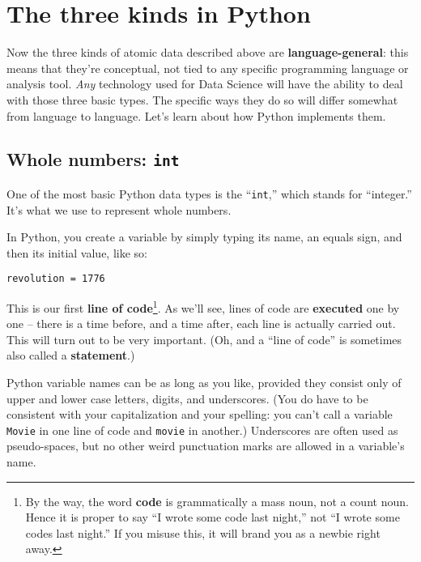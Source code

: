 \section{The three kinds in Python}

Now the three kinds of atomic data described above are
\textbf{language-general}: this means that they're conceptual, not tied to any
specific programming language or analysis tool. \textit{Any} technology used
for Data Science will have the ability to deal with those three basic types.
The specific ways they do so will differ somewhat from language to language.
Let's learn about how Python implements them.

\subsection{Whole numbers: \texttt{int}}

One of the most basic Python data types is the ``\texttt{int},'' which stands
for ``integer.'' It's what we use to represent whole numbers.

In Python, you create a variable by simply typing its name, an equals sign, and
then its initial value, like so:

\begin{Verbatim}[fontsize=\small,samepage=true,frame=single,framesep=3mm]
revolution = 1776
\end{Verbatim}

This is our first \textbf{line of code}\footnote{By the way, the word
\textbf{code} is grammatically a mass noun, not a count noun. Hence it is
proper to say ``I wrote some code last night,'' not ``I wrote some codes last
night.'' If you misuse this, it will brand you as a newbie right away.}. As
we'll see, lines of code are \textbf{executed} one by one -- there is a time
before, and a time after, each line is actually carried out. This will turn out
to be very important. (Oh, and a ``line of code'' is sometimes also called a
\textbf{statement}.)


Python variable names can be as long as you like, provided they consist only of
upper and lower case letters, digits, and underscores. (You do have to be
consistent with your capitalization and your spelling: you can't call a
variable \texttt{Movie} in one line of code and \texttt{movie} in another.)
Underscores are often used as pseudo-spaces, but no other weird punctuation
marks are allowed in a variable's name.

